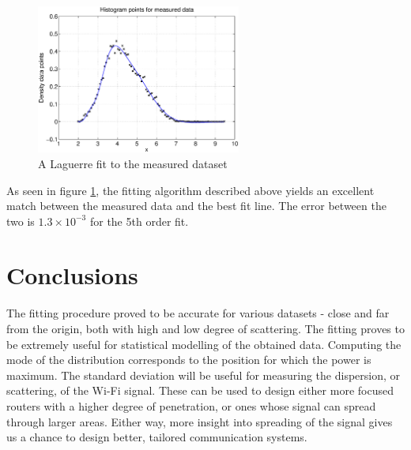 \documentclass[a4paper]{article}
\numberwithin{equation}{section}
\begin{document}
\begin{figure}[!h]
\centering
\includegraphics[width=0.6\textwidth]{real_data_fit.eps}
\caption{\label{fig:realdataset}A Laguerre fit to the measured dataset}
\end{figure}

\noindent As seen in figure \ref{fig:realdataset}, the fitting algorithm described above yields an excellent match between the measured data and the best fit line. The error between the two is $1.3 \times 10^{-3}$ for the 5th order fit.

\section{Conclusions}
The fitting procedure proved to be accurate for various datasets - close and far from the origin, both with high and low degree of scattering. The fitting proves to be extremely useful for statistical modelling of the obtained data. Computing the mode of the distribution corresponds to the position for which the power is maximum. The standard deviation will be useful for measuring the dispersion, or scattering, of the Wi-Fi signal. These can be used to design either more focused routers with a higher degree of penetration, or ones whose signal can spread through larger areas. Either way, more insight into spreading of the signal gives us a chance to design better, tailored communication systems.
\end{document}
